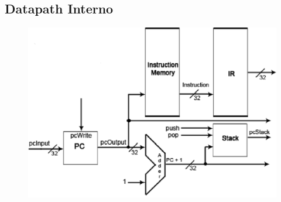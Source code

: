 	
	\subsection{Datapath Interno}
	\begin{figure}[h!]
		\begin{center}
		\includegraphics[scale=0.8]{./datapath/step1.eps}
		\end{center}
	\end{figure}
	